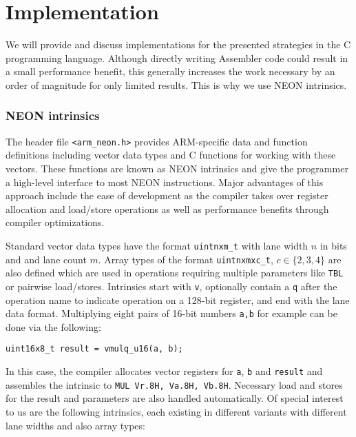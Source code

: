 \chapter{Implementation}

We will provide and discuss implementations for the presented strategies in the
C programming language. Although directly writing Assembler code could result
in a small performance benefit, this generally increases the work necessary by
an order of magnitude for only limited results. This is why we use NEON
intrinsics.

\subsection{NEON intrinsics}

The header file \texttt{<arm\_neon.h>} provides ARM-specific data and function
definitions including vector data types and C functions for working with these
vectors. These functions are known as NEON intrinsics and give the programmer a
high-level interface to most NEON instructions. Major advantages of this
approach include the ease of development as the compiler takes over register
allocation and load/store operations as well as performance benefits through
compiler optimizations.

Standard vector data types have the format \texttt{uintnxm\_t} with lane width
$n$ in bits and and lane count $m$. Array types of the format
\texttt{uintnxmxc\_t}, $c\in\{2,3,4\}$ are also defined which are used in
operations requiring multiple parameters like \texttt{TBL} or pairwise
load/stores. Intrinsics start with \texttt{v}, optionally contain a \texttt{q}
after the operation name to indicate operation on a 128-bit register, and end
with the lane data format. Multiplying eight pairs of 16-bit numbers
\texttt{a,b} for example can be done via the following:

\begin{center}
    \texttt{uint16x8\_t result = vmulq\_u16(a, b);}
\end{center}

In this case, the compiler allocates vector registers for \texttt{a},
\texttt{b} and \texttt{result} and assembles the intrinsic to \texttt{MUL
Vr.8H, Va.8H, Vb.8H}. Necessary load and stores for the result and parameters
are also handled automatically. Of special interest to us are the following
intrinsics, each existing in different variants with different lane widths and
also array types: \\

